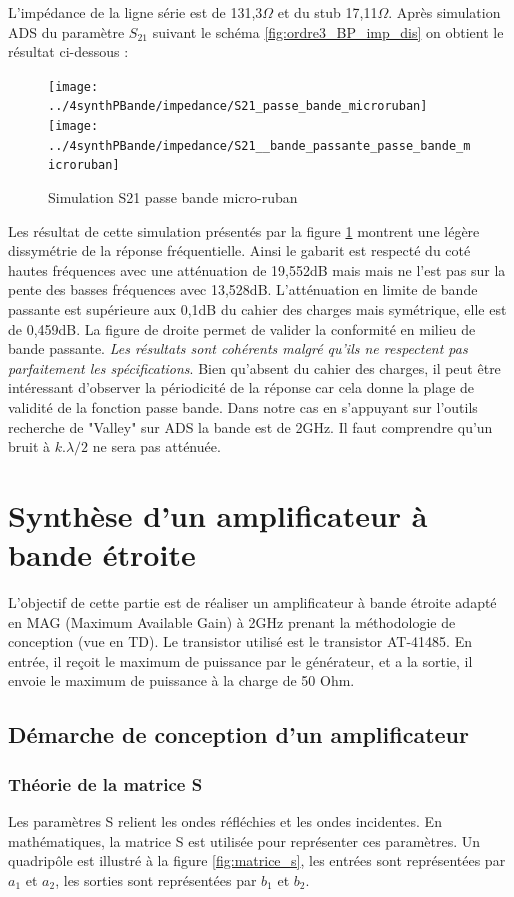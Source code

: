 \documentclass[french]{article}
\begin{document}
L'impédance de la ligne série est de 131,3$\Omega$ et du stub 17,11$\Omega$. Après simulation ADS du paramètre $S_{21}$ suivant le schéma \ref{fig:ordre3_BP_imp_dis} on obtient le résultat ci-dessous :
\begin{figure}[H]
	\centering
	\texttt{[image: ../4synthPBande/impedance/S21\_passe\_bande\_microruban]}
	\texttt{[image: ../4synthPBande/impedance/S21\_\_bande\_passante\_passe\_bande\_microruban]}
	\caption{Simulation S21 passe bande micro-ruban}
	\label{fig:ads_S21_BP_microruban}
\end{figure}
Les résultat de cette simulation présentés par la figure \ref{fig:ads_S21_BP_microruban} montrent une légère dissymétrie de la réponse fréquentielle. Ainsi le gabarit est respecté du coté hautes fréquences avec une atténuation de 19,552dB mais mais ne l'est pas sur la pente des basses fréquences avec 13,528dB. L'atténuation en limite de bande passante est supérieure aux 0,1dB du cahier des charges mais symétrique, elle est de 0,459dB. La figure de droite permet de valider la conformité en milieu de bande passante. \emph{Les résultats sont cohérents malgré qu'ils ne respectent pas parfaitement les spécifications}. Bien qu'absent du cahier des charges, il peut être intéressant d'observer la périodicité de la réponse car cela donne la plage de validité de la fonction passe bande. Dans notre cas en s'appuyant sur l'outils recherche de "Valley" sur ADS la bande est de 2GHz. Il faut comprendre qu'un bruit à $k.\lambda /2$ ne sera pas atténuée.
 


\newpage
\section{Synthèse d'un amplificateur à bande étroite}
L’objectif de cette partie est de réaliser un amplificateur à bande étroite adapté en MAG (Maximum Available Gain) à 2GHz prenant la méthodologie de conception (vue en TD). Le transistor utilisé est le transistor AT-41485. En entrée, il reçoit le maximum de puissance par le générateur, et a la sortie, il envoie le maximum de puissance à la charge de 50 Ohm.

\subsection{Démarche de conception d’un amplificateur}


\subsubsection{Théorie de la matrice S}
Les paramètres S relient les ondes réfléchies et les ondes incidentes. En mathématiques, la matrice S est utilisée pour représenter ces paramètres. Un quadripôle est illustré à la figure \ref{fig:matrice_s}, les entrées sont représentées par $a_{1}$ et $a_{2}$, les sorties sont représentées par $b_{1}$ et $b_{2}$. 
\end{document}
